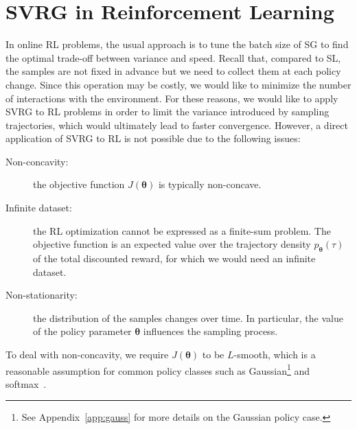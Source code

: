 \documentclass{article}
\makeatletter
\theoremstyle{remark}
\theoremstyle{definition}
\DeclareRobustCommand{\eg}{e.g.,\@\xspace}
\newcommand{\todopir}[1]{\todo[color=blued, inline]{\small #1}}
\newcommand{\vtheta}{\boldsymbol{\theta}}
\makeatother
\begin{document}
\section{SVRG in Reinforcement Learning}\label{sec:alg}
In online RL problems, the usual approach is to tune the batch size of SG to find the optimal trade-off between variance and speed.
Recall that, compared to SL, the samples are not fixed in advance but we need to collect them at each policy change.
Since this operation may be costly, we would like to minimize the number of interactions with the environment.
For these reasons, we would like to apply SVRG to RL problems in order to limit the variance introduced by sampling trajectories, which would ultimately lead to faster convergence.
However, a direct application of SVRG to RL is not possible due to the following issues:
\begin{description}
        \item[Non-concavity:] the objective function $J(\vtheta)$ is typically non-concave.
        \item[Infinite dataset:] the RL optimization cannot be expressed as a finite-sum problem. The objective function is an expected value over the trajectory density $p_{\vtheta}(\tau)$ of the total discounted reward, for which we would need an infinite dataset.
        \item[Non-stationarity:] the distribution of the samples changes over time. In particular, the value of the policy parameter $\vtheta$ influences the sampling process.
\end{description}
To deal with non-concavity, we require $J(\vtheta)$ to be $L$-smooth, which is a reasonable assumption for common policy classes such as Gaussian\footnote{See Appendix~\ref{app:gauss} for more details on the Gaussian policy case.} and softmax~\citep[\eg][]{Furmston2012unifying,pirotta2015lipschitz}.
\end{document}
